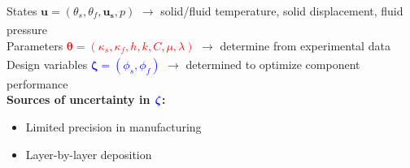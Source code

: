 \documentclass[10pt,xcolor=dvipsnames,compress]{beamer}
\begin{document}
\begin{frame}
\small{
 States $\boldsymbol{u} = ( \theta_s, \theta_f, \boldsymbol{u_s}, p)$ $\xrightarrow[]{}$ solid/fluid temperature, solid displacement, fluid pressure \vspace{0.05in}\\
 Parameters \textcolor{red}{    $\boldsymbol{\theta} = (\kappa_s, \kappa_f, h, k, C, \mu, \lambda)$} $\xrightarrow[]{}$ determine from experimental data  \vspace{0.05in}\\ %
  Design variables \textcolor{blue}{   $\boldsymbol{\zeta} = (\phi_s,\phi_f)$} $\xrightarrow[]{}$ determined to optimize component performance
\vspace{0.15 in}\\}
\textbf{Sources of uncertainty in ${\color{blue} \boldsymbol{\zeta}}$:}
    \begin{itemize}
    \item Limited precision in manufacturing %
    \item Layer-by-layer deposition %
    \end{itemize}
\vfill
\end{frame}
\end{document}
